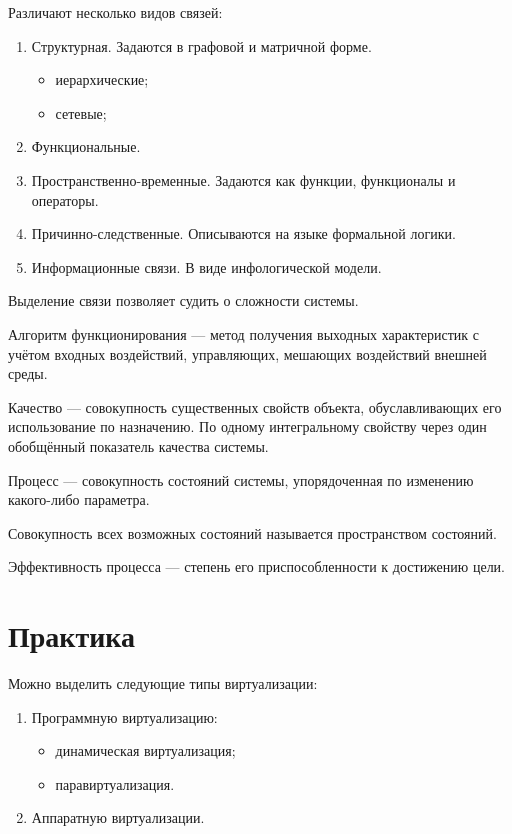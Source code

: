 \documentclass[12pt, russian, oneside, article]{ncc}
\begin{document}
Различают несколько видов связей:
\begin{enumerate}
\item Структурная. Задаются в графовой и матричной форме.

\begin{itemize}
\item иерархические;
\item сетевые;
\end{itemize}

\item Функциональные.
\item Пространственно-временные. Задаются как функции, функционалы и операторы.
\item Причинно-следственные. Описываются на языке формальной логики.
\item Информационные связи. В виде инфологической модели.
\end{enumerate}

Выделение связи позволяет судить о сложности системы.

Алгоритм функционирования --- метод получения выходных характеристик с учётом входных воздействий, управляющих, мешающих воздействий внешней среды.

Качество --- совокупность существенных свойств объекта, обуславливающих его использование по назначению. По одному интегральному свойству через один обобщённый показатель качества системы.

Процесс --- совокупность состояний системы, упорядоченная по изменению какого-либо параметра.

Совокупность всех возможных состояний называется пространством состояний.

Эффективность процесса --- степень его приспособленности к достижению цели.
\section{Практика}
\label{sec-10}


Можно выделить следующие типы виртуализации:
\begin{enumerate}
\item Программную виртуализацию:

\begin{itemize}
\item динамическая виртуализация;
\item паравиртуализация.
\end{itemize}

\item Аппаратную виртуализации.
\end{enumerate}
\end{document}
